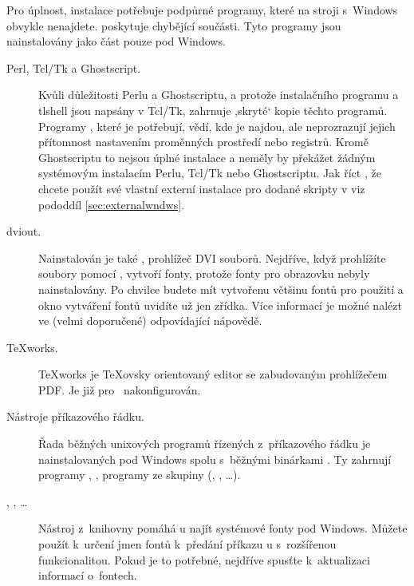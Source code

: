 \documentclass[\classoptions,slovak,english,czech]{\classname}
\newcommand{\singleuv}[1]{,#1`}
\begin{document}
Pro úplnost, instalace \TL{} potřebuje podpůrné programy,
které na stroji s~Windows obvykle nenajdete.
\TL{} poskytuje chybějící součásti. Tyto programy jsou nainstalovány jako 
část \TL{} pouze pod Windows.

\begin{description}
\item[Perl, Tcl/Tk a Ghostscript.] Kvůli důležitosti Perlu a Ghostscriptu,
a protože \GUI{} instalačního programu a tlshell jsou napsány v Tcl/Tk, 
zahrnuje \TL{} \singleuv{skryté} kopie těchto programů.  
Programy \TL{}, které je potřebují, vědí, kde je najdou, ale
neprozrazují jejich přítomnost nastavením proměnných prostředí nebo 
registrů. Kromě Ghostscriptu to nejsou úplné instalace a neměly by překážet žádným 
systémovým instalacím Perlu, Tcl/Tk nebo Ghostscriptu. Jak říct \TL{}, že chcete použít své vlastní externí instalace pro dodané
skripty v \TL viz pododdíl \ref{sec:externalwndws}. 

\item[dviout.] Nainstalován je také , prohlížeč
  DVI souborů.  Nejdříve, když prohlížíte soubory pomocí 
  , vytvoří fonty, 
  protože fonty pro obrazovku nebyly nainstalovány. Po chvilce 
  budete mít vytvořenu většinu fontů pro použití a okno 
  vytváření fontů uvidíte už jen zřídka.  Více informací
  je možné nalézt ve (velmi doporučené) odpovídající nápovědě.
\item[\TeX{}works.]  \TeX{}works je \TeX ovsky orientovaný
  editor se zabudovaným prohlížečem PDF. 
  Je již pro \TL\ nakonfigurován.

\item[Nástroje příkazového řádku.] Řada běžných unixových
  programů řízených z~příkazového řádku je nainstalovaných
  pod Windows spolu s~běžnými binárkami \TL. Ty zahrnují
  programy , ,%
  programy ze skupiny  (,
  , \ldots).
     
\item[, , \ldots] Nástroj z~knihovny 
   pomáhá \XeTeX{}u najít systémové fonty pod Windows.  
  Můžete použít  k~určení jmen fontů 
  k~předání příkazu \XeTeX{}u  s~rozšířenou funkcionalitou. 
  Pokud je to potřebné, nejdříve spusťte 
  k~aktualizaci informací o~fontech.
\end{description}
\end{document}
